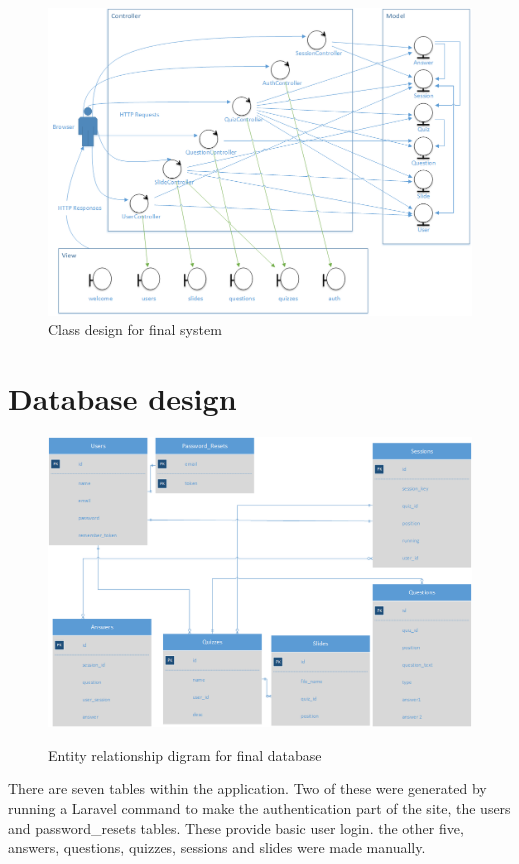 \begin{figure}
	\caption{Class design for final system}
	\centerline{\includegraphics{Chapter3/overall-class-design}}
	\label{fig:overall-class-design}
\end{figure}

\section{Database design}
\begin{figure}
	\caption{Entity relationship digram for final database}
	\includegraphics[width=\textwidth]{Chapter3/Final-ER-Image}
	\label{fig:er-diagram}
\end{figure}
\newpage

There are seven tables within the application. Two of these were generated by running a Laravel command to make the authentication part of the site, the users and password\_resets tables. These provide basic user login. the other five, answers, questions, quizzes, sessions and slides were made manually.

